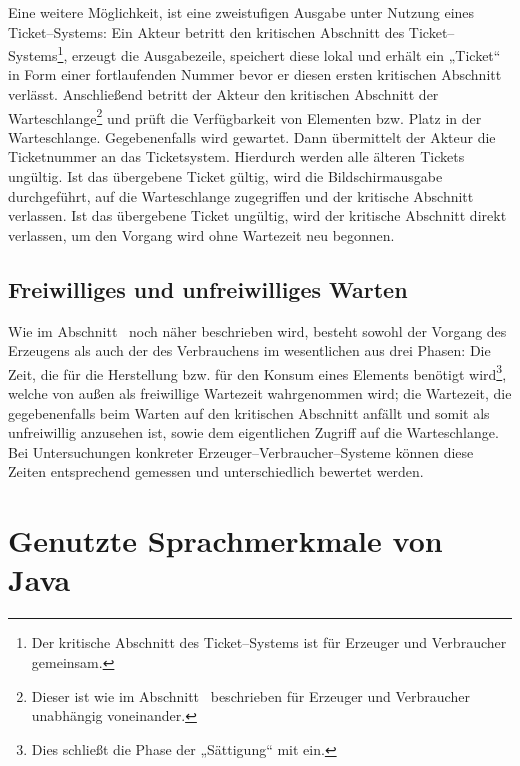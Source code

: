 Eine weitere Möglichkeit, ist eine zweistufigen Ausgabe unter Nutzung eines Ticket–Systems: Ein Akteur betritt den kritischen Abschnitt des Ticket–Systems\footnote{Der kritische Abschnitt des Ticket–Systems ist für Erzeuger und Verbraucher gemeinsam.}, erzeugt die Ausgabezeile, speichert diese lokal und erhält ein „Ticket“ in Form einer fortlaufenden Nummer bevor er diesen ersten kritischen Abschnitt verlässt. Anschließend betritt der Akteur den kritischen Abschnitt der Warteschlange\footnote{Dieser ist wie im Abschnitt~ beschrieben für Erzeuger und Verbraucher unabhängig voneinander.} und prüft die Verfügbarkeit von Elementen bzw. Platz in der Warteschlange. Gegebenenfalls wird gewartet. Dann übermittelt der Akteur die Ticketnummer an das Ticketsystem. Hierdurch werden alle älteren Tickets ungültig. Ist das übergebene Ticket gültig, wird die Bildschirmausgabe durchgeführt, auf die Warteschlange zugegriffen und der kritische Abschnitt verlassen. Ist das übergebene Ticket ungültig, wird der kritische Abschnitt direkt verlassen, um den Vorgang wird ohne Wartezeit neu begonnen. 

\subsection{Freiwilliges und unfreiwilliges Warten} %
\label{sub:freiwilliges_und_unfreiwilliges_warten}

Wie im Abschnitt~ noch näher beschrieben wird, besteht sowohl der Vorgang des Erzeugens als auch der des Verbrauchens im wesentlichen aus drei Phasen: Die Zeit, die für die Herstellung bzw. für den Konsum eines Elements benötigt wird\footnote{Dies schließt die Phase der „Sättigung“ mit ein.}, welche von außen als freiwillige Wartezeit wahrgenommen wird; die Wartezeit, die gegebenenfalls beim Warten auf den kritischen Abschnitt anfällt und somit als unfreiwillig anzusehen ist, sowie dem eigentlichen Zugriff auf die Warteschlange. Bei Untersuchungen konkreter Erzeuger–Verbraucher–Systeme können diese Zeiten entsprechend gemessen und unterschiedlich bewertet werden.



\newpage
\section{Genutzte Sprachmerkmale von Java} %
\label{sec:genutzte_sprachmerkmale_von_java}

